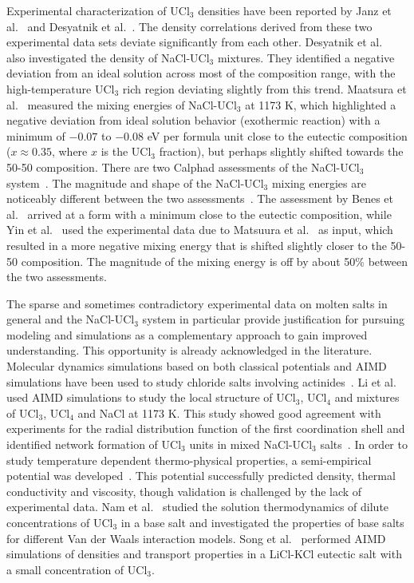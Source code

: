 \documentclass[preprint,3p,10pt,twocolumn,number,sort&compress]{elsarticle}
\begin{document}
Experimental characterization of UCl$_3$ densities have been reported by Janz et al.~\cite{Janz1988} and Desyatnik et al.~\cite{Desyatnik}. The density correlations derived from these two experimental data sets deviate significantly from each other. Desyatnik et al.~\cite{Desyatnik} also investigated the density of NaCl-UCl$_3$ mixtures. They identified a negative deviation from an ideal solution across most of the composition range, with the high-temperature UCl$_3$ rich region deviating slightly from this trend. 
Maatsura et al.~\cite{Matsuura} measured the mixing energies of NaCl-UCl$_3$ at 1173 K, which highlighted a negative deviation from ideal solution behavior (exothermic reaction) with a  minimum of $-0.07$ to $-0.08$ eV per formula unit close to the eutectic composition ($x\approx 0.35$, where $x$ is the UCl$_3$ fraction), but perhaps slightly shifted towards the 50-50 composition. There are two Calphad assessments of the NaCl-UCl$_3$ system~\cite{BENES2008, YIN2020}. The magnitude and shape of the NaCl-UCl$_3$ mixing energies are noticeably different between the two assessments~\cite{YIN2020}. The assessment by Benes et al.~\cite{BENES2008} arrived at a form with a minimum close to the eutectic composition, while Yin et al.~\cite{YIN2020} used the experimental data due to Matsuura et al.~\cite{Matsuura} as input, which resulted in a more negative mixing energy that is shifted slightly closer to the 50-50 composition. The magnitude of the mixing energy is off by about 50\% between the two assessments. 

The sparse and sometimes contradictory experimental data on molten salts in general and the NaCl-UCl$_3$ system in particular provide justification for pursuing modeling and simulations as a complementary approach to gain improved understanding. This opportunity is already acknowledged  in the literature. Molecular dynamics simulations based on both classical potentials and AIMD simulations have been used to study chloride salts involving actinides~\cite{Li,Li2020,Nam2015,SONG}. Li et al.~\cite{Li} used AIMD simulations to study the local structure of UCl$_3$, UCl$_4$ and mixtures of UCl$_3$, UCl$_4$ and NaCl at 1173 K. This study showed good agreement with experiments for the radial distribution function of the first coordination shell and identified network formation of UCl$_3$ units in mixed NaCl-UCl$_3$ salts~\cite{Li}. %
In order to study temperature dependent thermo-physical properties, a semi-empirical potential was developed~\cite{Li2020}. This potential successfully predicted density, thermal conductivity and viscosity, though validation is challenged by the lack of experimental data. Nam et al.~\cite{Nam2015} studied the solution thermodynamics of dilute concentrations of UCl$_3$ in a base salt and investigated the properties of base salts for different Van der Waals interaction models. Song et al.~\cite{SONG} performed AIMD simulations of densities and transport properties in a LiCl-KCl eutectic salt with a small concentration of UCl$_3$. 
\end{document}
